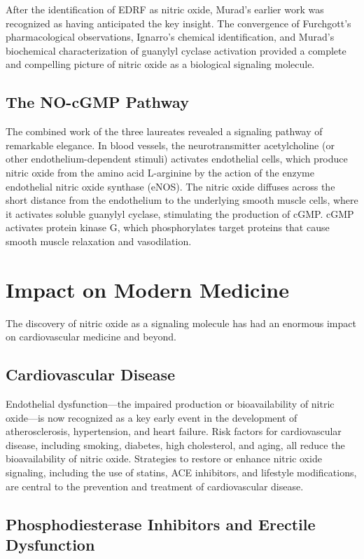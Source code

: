 After the identification of EDRF as nitric oxide, Murad's earlier work was recognized as having anticipated the key insight. The convergence of Furchgott's pharmacological observations, Ignarro's chemical identification, and Murad's biochemical characterization of guanylyl cyclase activation provided a complete and compelling picture of nitric oxide as a biological signaling molecule.

\subsection{The NO-cGMP Pathway}

The combined work of the three laureates revealed a signaling pathway of remarkable elegance. In blood vessels, the neurotransmitter acetylcholine (or other endothelium-dependent stimuli) activates endothelial cells, which produce nitric oxide from the amino acid L-arginine by the action of the enzyme endothelial nitric oxide synthase (eNOS). The nitric oxide diffuses across the short distance from the endothelium to the underlying smooth muscle cells, where it activates soluble guanylyl cyclase, stimulating the production of cGMP. cGMP activates protein kinase G, which phosphorylates target proteins that cause smooth muscle relaxation and vasodilation.

\section{Impact on Modern Medicine}

The discovery of nitric oxide as a signaling molecule has had an enormous impact on cardiovascular medicine and beyond.

\subsection{Cardiovascular Disease}

Endothelial dysfunction---the impaired production or bioavailability of nitric oxide---is now recognized as a key early event in the development of atherosclerosis, hypertension, and heart failure. Risk factors for cardiovascular disease, including smoking, diabetes, high cholesterol, and aging, all reduce the bioavailability of nitric oxide. Strategies to restore or enhance nitric oxide signaling, including the use of statins, ACE inhibitors, and lifestyle modifications, are central to the prevention and treatment of cardiovascular disease.

\subsection{Phosphodiesterase Inhibitors and Erectile Dysfunction}

